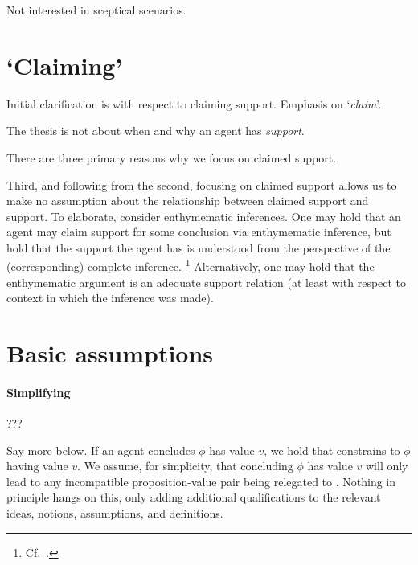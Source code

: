 \begin{note}
  Not interested in sceptical scenarios.
\end{note}

\section{`Claiming'}
\label{sec:claiming}

\begin{note}
  Initial clarification is with respect to claiming support.
  Emphasis on `\emph{claim}'.

  The thesis is not about when and why an agent has \emph{support}.

  There are three primary reasons why we focus on claimed support.

  Third, and following from the second, focusing on claimed support allows us to make no assumption about the relationship between claimed support and support.
  To elaborate, consider enthymematic inferences.
  One may hold that an agent may claim support for some conclusion via enthymematic inference, but hold that the support the agent has is understood from the perspective of the (corresponding) complete inference.\nolinebreak
  \footnote{
    Cf.\ \textcite{Moretti:2019wx}.
  }
  Alternatively, one may hold that the enthymematic argument is an adequate support relation (at least with respect to context in which the inference was made).
\end{note}

\section{Basic assumptions}
\label{sec:basic-assumptions}

\paragraph{Simplifying}

\begin{assumption}
  \label{assu:simplifying:epPAlways}
  ???
\end{assumption}

\begin{note}
  Say more below.
  If an agent concludes \(\phi\) has value \(v\), we hold that constrains  to \(\phi\) having value \(v\).
  We assume, for simplicity, that concluding \(\phi\) has value \(v\) will only lead to any incompatible proposition-value pair being relegated to \epPAd{}.
  Nothing in principle hangs on this, only adding additional qualifications to the relevant ideas, notions, assumptions, and definitions.
\end{note}

